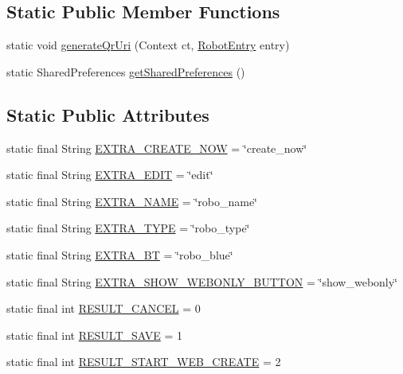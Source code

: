 \subsection*{Static Public Member Functions}
\begin{DoxyCompactItemize}
\item 
static void \hyperlink{classcom_1_1cellbots_1_1_robot_selection_activity_a77640d8e7e99ed85bab8f6932e0ee261}{generate\-Qr\-Uri} (Context ct, \hyperlink{classcom_1_1cellbots_1_1_robot_entry}{Robot\-Entry} entry)
\item 
static Shared\-Preferences \hyperlink{classcom_1_1cellbots_1_1_robot_selection_activity_ac08722c17c758fe2531152fa256fc450}{get\-Shared\-Preferences} ()
\end{DoxyCompactItemize}
\subsection*{Static Public Attributes}
\begin{DoxyCompactItemize}
\item 
static final String \hyperlink{classcom_1_1cellbots_1_1_robot_selection_activity_a04e9a3abfaa019e43d09e1818437d85c}{E\-X\-T\-R\-A\-\_\-\-C\-R\-E\-A\-T\-E\-\_\-\-N\-O\-W} = \char`\"{}create\-\_\-now\char`\"{}
\item 
static final String \hyperlink{classcom_1_1cellbots_1_1_robot_selection_activity_a7503e169d09970fb21d02279571f3f43}{E\-X\-T\-R\-A\-\_\-\-E\-D\-I\-T} = \char`\"{}edit\char`\"{}
\item 
static final String \hyperlink{classcom_1_1cellbots_1_1_robot_selection_activity_a1684e23b72301c225631f420686e600a}{E\-X\-T\-R\-A\-\_\-\-N\-A\-M\-E} = \char`\"{}robo\-\_\-name\char`\"{}
\item 
static final String \hyperlink{classcom_1_1cellbots_1_1_robot_selection_activity_aa4d96eab5d30aab8c2ca6dc528f6e6ce}{E\-X\-T\-R\-A\-\_\-\-T\-Y\-P\-E} = \char`\"{}robo\-\_\-type\char`\"{}
\item 
static final String \hyperlink{classcom_1_1cellbots_1_1_robot_selection_activity_a792340fd2c3931524798fd8f0007d8f1}{E\-X\-T\-R\-A\-\_\-\-B\-T} = \char`\"{}robo\-\_\-blue\char`\"{}
\item 
static final String \hyperlink{classcom_1_1cellbots_1_1_robot_selection_activity_a0b8451b5462a3d8f6cf0c3ed566c4d36}{E\-X\-T\-R\-A\-\_\-\-S\-H\-O\-W\-\_\-\-W\-E\-B\-O\-N\-L\-Y\-\_\-\-B\-U\-T\-T\-O\-N} = \char`\"{}show\-\_\-webonly\char`\"{}
\item 
static final int \hyperlink{classcom_1_1cellbots_1_1_robot_selection_activity_af2f0c83cac408a85071d3b95fdea4c6b}{R\-E\-S\-U\-L\-T\-\_\-\-C\-A\-N\-C\-E\-L} = 0
\item 
static final int \hyperlink{classcom_1_1cellbots_1_1_robot_selection_activity_a58905ded45c5c3bffe846f08f7e0131d}{R\-E\-S\-U\-L\-T\-\_\-\-S\-A\-V\-E} = 1
\item 
static final int \hyperlink{classcom_1_1cellbots_1_1_robot_selection_activity_a048ac1c9abd537fcada0099a739bc591}{R\-E\-S\-U\-L\-T\-\_\-\-S\-T\-A\-R\-T\-\_\-\-W\-E\-B\-\_\-\-C\-R\-E\-A\-T\-E} = 2
\end{DoxyCompactItemize}
